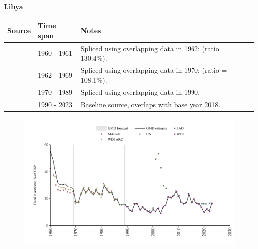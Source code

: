 \documentclass[12pt,a4paper,landscape]{article}
\begin{document}
\begin{adjustbox}{max totalsize={\paperwidth}{\paperheight},center}
\begin{minipage}[t][\textheight][t]{\textwidth}
\vspace*{0.5cm}
{}
\begin{center}
{\Large\bfseries Libya}
\end{center}
\vspace{0.5cm}
\begin{table}[H]
\centering
\small
\begin{tabular}{|l|l|l|}
\hline
\textbf{Source} & \textbf{Time span} & \textbf{Notes} \\
\hline
\rowcolor{white}\cite{Mitchell}& 1960 - 1961 &Spliced using overlapping data in 1962: (ratio = 130.4\%).\\
\rowcolor{lightgray}\cite{WDI_ARC}& 1962 - 1969 &Spliced using overlapping data in 1970: (ratio = 108.1\%).\\
\rowcolor{white}\cite{UN}& 1970 - 1989 &Spliced using overlapping data in 1990.\\
\rowcolor{lightgray}\cite{WDI}& 1990 - 2023 &Baseline source, overlaps with base year 2018.\\
\hline
\end{tabular}
\end{table}
\begin{figure}[H]
\centering
\includegraphics[width=\textwidth,height=0.6\textheight,keepaspectratio]{graphs/LBY_finv_GDP.pdf}
\end{figure}
\end{minipage}
\end{adjustbox}
\end{document}
